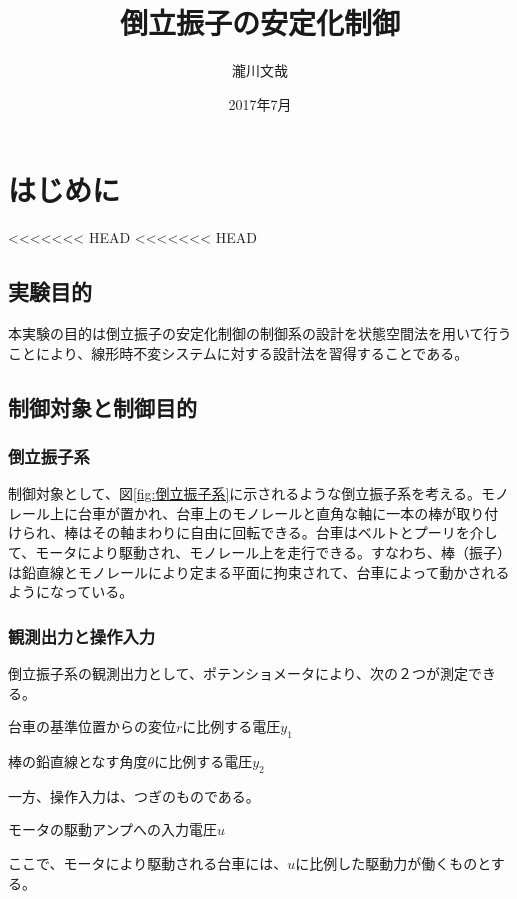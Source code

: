 \documentclass[a4j,11pt,twoside]{ujbook}
\begin{document}
\title{倒立振子の安定化制御}
\author{瀧川文哉}
\date{2017年7月}
\maketitle
\tableofcontents
\listoffigures
\listoftables
\cleardoublepage
{}
\chapter{はじめに}
<<<<<<< HEAD
<<<<<<< HEAD
\section{実験目的}
本実験の目的は倒立振子の安定化制御の制御系の設計を状態空間法を用いて行うことにより、線形時不変システムに対する設計法を習得することである。
\section{制御対象と制御目的}
\subsection{倒立振子系}
制御対象として、図\ref{fig:倒立振子系}に示されるような倒立振子系を考える。モノレール上に台車が置かれ、台車上のモノレールと直角な軸に一本の棒が取り付けられ、棒はその軸まわりに自由に回転できる。台車はベルトとプーリを介して、モータにより駆動され、モノレール上を走行できる。すなわち、棒（振子）は鉛直線とモノレールにより定まる平面に拘束されて、台車によって動かされるようになっている。

\subsection{観測出力と操作入力}
倒立振子系の観測出力として、ポテンショメータにより、次の２つが測定できる。
\begin{description}
	\setlength{\itemindent}{0pt}
	\item[1°] 台車の基準位置からの変位$r$に比例する電圧$y_1$
	\item[2°] 棒の鉛直線となす角度$\theta$に比例する電圧$y_2$
\end{description}
一方、操作入力は、つぎのものである。
\begin{description}
	\setlength{\itemindent}{0pt}
	\item[1°] モータの駆動アンプへの入力電圧$u$
\end{description}
ここで、モータにより駆動される台車には、$u$に比例した駆動力が働くものとする。
\end{document}
